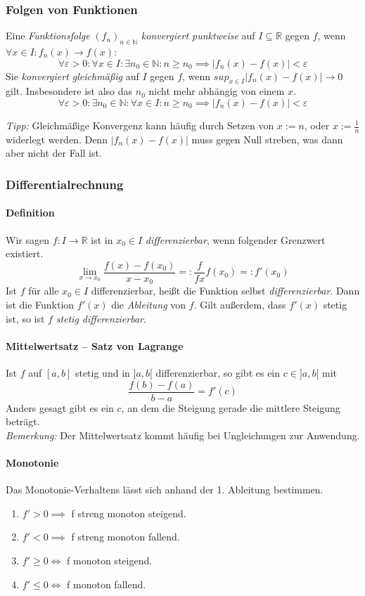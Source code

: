 \documentclass[a4paper, 9pt, DIV=24]{scrartcl}
\newcommand{\N}{\mathbb{N}}
\newcommand{\R}{\mathbb{R}}
\begin{document}
\subsubsection{Folgen von Funktionen}
Eine \emph{Funktionsfolge} $(f_n)_{n\in\N}$ \emph{konvergiert punktweise} auf $I \subseteq \R$ gegen $f$, wenn $\forall x\in I: f_n(x) \rightarrow f(x)$:
\[ \forall \varepsilon > 0: \forall x \in I: \exists n_0 \in \N: n \geq n_0 \implies |f_n(x)-f(x)| < \varepsilon \]
Sie \emph{konvergiert gleichmäßig} auf $I$ gegen $f$, wenn $sup_{x\in I} |f_n(x) - f(x)| \rightarrow 0$ gilt.
Insbesondere ist also das $n_0$ nicht mehr abhängig von einem $x$.
\[ \forall \varepsilon > 0: \exists n_0 \in \N: \forall x \in I: n \geq n_0 \implies |f_n(x)-f(x)| < \varepsilon \]

\emph{Tipp: } Gleichmäßige Konvergenz kann häufig durch Setzen von $x := n$, oder $x := \frac{1}{n}$ widerlegt werden.
Denn $|f_n(x) - f(x)|$ muss gegen Null streben, was dann aber nicht der Fall ist.

\subsubsection{Differentialrechnung}

\paragraph{Definition}
Wir sagen $f: I \rightarrow \R$ ist in $x_0 \in I$ \emph{differenzierbar}, wenn folgender Grenzwert existiert.
\[
 \lim_{x\rightarrow x_0} \dfrac{f(x) - f(x_0)}{x - x_0} =: \dfrac{f}{fx} f(x_0) =: f'(x_0)
\]
Ist $f$ für alle $x_0 \in I$ differenzierbar, heißt die Funktion selbst \emph{differenzierbar}.
Dann ist die Funktion $f'(x)$ die \emph{Ableitung} von $f$.
Gilt außerdem, dass $f'(x)$ stetig ist, so ist $f$ \emph{stetig differenzierbar}.

\paragraph{Mittelwertsatz -- Satz von Lagrange}
Ist $f$ auf $[a,b]$ stetig und in $]a,b[$ differenzierbar, so gibt es ein $c \in ]a,b[$ mit
\[ \dfrac{f(b) - f(a)}{b-a} = f'(c) \]
Anders gesagt gibt es ein $c$, an dem die Steigung gerade die mittlere Steigung beträgt.\\
\emph{Bemerkung:} Der Mittelwertsatz kommt häufig bei Ungleichungen zur Anwendung.

\paragraph{Monotonie}
Das Monotonie-Verhaltens lässt sich anhand der 1. Ableitung bestimmen.
\begin{enumerate}[label={(}\arabic*{)}]
 \item $f' > 0 \implies $ f streng monoton steigend.
 \item $f' < 0 \implies $ f streng monoton fallend.
 \item $f' \geq 0 \iff $ f monoton steigend.
 \item $f' \leq 0 \iff $ f monoton fallend.
\end{enumerate}
\end{document}
